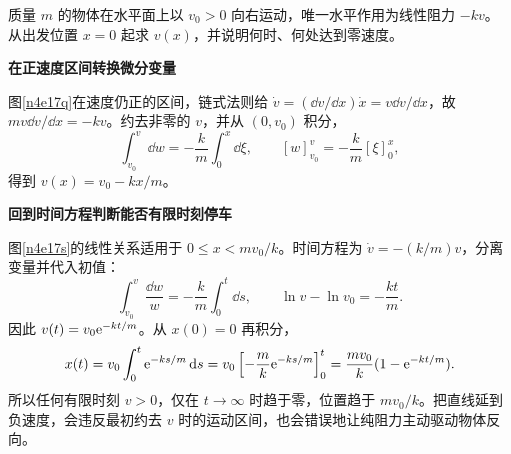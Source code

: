 \begin{question}\begin{example}[线性阻力下速度随位移的变化]\label{n4e17}
质量 $m$ 的物体在水平面上以 $v_0>0$ 向右运动，唯一水平作用为线性阻力 $-kv$。从出发位置 $x=0$ 起求 $v(x)$，并说明何时、何处达到零速度。
\end{example}\end{question}
\begin{solution}\textbf{在正速度区间转换微分变量}\par\nobreak
图\ref{n4e17q}在速度仍正的区间，链式法则给
$\dot v=(\dd v/\dd x)\dot x=v\dd v/\dd x$，故
$mv\dd v/\dd x=-kv$。约去非零的 $v$，并从 $(0,v_0)$ 积分，
\[
\int_{v_0}^{v}\dd w=-\frac km\int_0^x\dd\xi,
\qquad
[w]_{v_0}^{v}=-\frac km[\xi]_0^x,
\]
得到 $v(x)=v_0-kx/m$。


\par\medskip{}\noindent\textbf{回到时间方程判断能否有限时刻停车}\par\nobreak
图\ref{n4e17s}的线性关系适用于 $0\le x<mv_0/k$。时间方程为 $\dot v=-(k/m)v$，分离变量并代入初值：
\[
\int_{v_0}^{v}\frac{\dd w}{w}=-\frac km\int_0^t\dd s,
\qquad
\ln v-\ln v_0=-\frac{kt}{m}.
\]
因此 $v(t)=v_0\mathrm e^{-kt/m}$。从 $x(0)=0$ 再积分，
\[
x(t)=v_0\int_0^t\mathrm e^{-ks/m}\mathop{}\!\mathrm d s
=v_0\left[-\frac mk\mathrm e^{-ks/m}\right]_0^t
=\frac{mv_0}{k}(1-\mathrm e^{-kt/m}).
\]
所以任何有限时刻 $v>0$，仅在 $t\to\infty$ 时趋于零，位置趋于 $mv_0/k$。把直线延到负速度，会违反最初约去 $v$ 时的运动区间，也会错误地让纯阻力主动驱动物体反向。
\end{solution}

